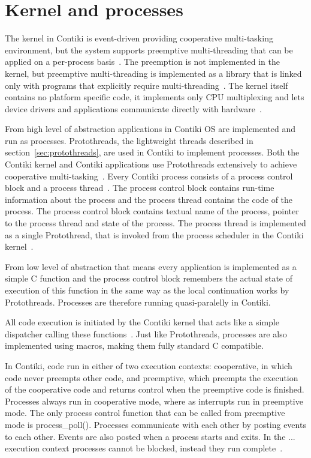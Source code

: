 
\section{Kernel and processes}
The kernel in Contiki is event-driven providing cooperative multi-tasking
environment, but the system supports preemptive
multi-threading that can be applied on a per-process basis~\cite{video}.
The preemption is not implemented in the kernel, but
preemptive multi-threading is implemented as a library that is linked only with programs that
explicitly require multi-threading~\cite{paper-contiki}.
The kernel itself contains no platform specific code, it implements only CPU multiplexing and
lets device drivers and applications communicate directly with hardware~\cite{video}.

From high level of abstraction
applications in Contiki OS are implemented and run as processes.
Protothreads, the lightweight threads described in section~\ref{sec:protothreads},
are used in Contiki to implement processes.
Both the Contiki kernel and Contiki applications use
Protothreads extensively to achieve cooperative multi-tasking~\cite{contiki-wiki-faq}.
Every Contiki process consists of a process control block and a process thread~\cite{contiki-wiki-processes}.
The process control block contains run-time information about the process and
the process thread contains the code of the process.
The process control block contains
textual name of the process, pointer to the process thread and state of the process.
The process thread is implemented as a single Protothread,
that is invoked from the process scheduler in the Contiki kernel~\cite{contiki-wiki-processes}.

From low level of abstraction that means
every application is implemented as a simple C function
and the process control block remembers the actual state of execution of this function
in the same way as the local continuation works by Protothreads.
Processes are therefore running quasi-paralelly in Contiki.

All code execution is initiated by the Contiki kernel
that acts like a simple dispatcher calling these functions~\cite{contiki-docs}.
Just like Protothreads, processes are also implemented using macros,
making them fully standard C compatible.

In Contiki, code run in either of two execution contexts:
cooperative, in which code never preempts other code, and preemptive,
which preempts the execution of the cooperative code and returns control
when the preemptive code is finished.
Processes always run in cooperative mode, where as interrupts run in preemptive mode.
The only process control function that can be called from preemptive mode is process\_poll(). 
Processes communicate with each other by posting events to each other.
Events are also posted when a process starts and exits.
In the ... execution context processes cannot be blocked,
instead they run complete~\cite{video, paper-contiki}.

